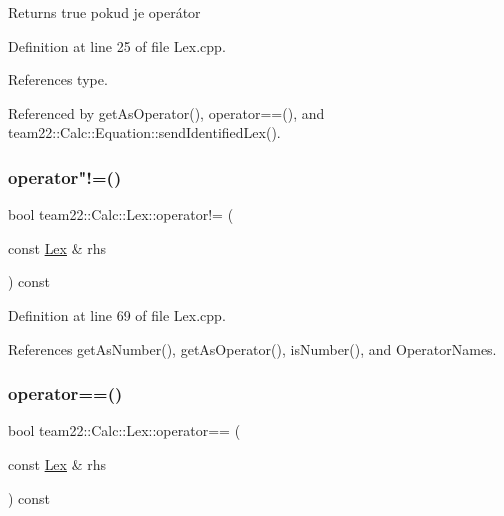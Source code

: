 \begin{DoxyReturn}{Returns}
true pokud je operátor 
\end{DoxyReturn}


Definition at line 25 of file Lex.\+cpp.



References type.



Referenced by get\+As\+Operator(), operator==(), and team22\+::\+Calc\+::\+Equation\+::send\+Identified\+Lex().

\mbox{\label{classteam22_1_1_calc_1_1_lex_a25b4f3b98b68c4d967eb3695efc78667}} 
\subsubsection{\texorpdfstring{operator"!=()}{operator!=()}}
{\footnotesize\ttfamily bool team22\+::\+Calc\+::\+Lex\+::operator!= (\begin{DoxyParamCaption}\item[{const \hyperlink{classteam22_1_1_calc_1_1_lex}{Lex} \&}]{rhs }\end{DoxyParamCaption}) const}



Definition at line 69 of file Lex.\+cpp.



References get\+As\+Number(), get\+As\+Operator(), is\+Number(), and Operator\+Names.

\mbox{\label{classteam22_1_1_calc_1_1_lex_a55858e2719cb121fccff59eed42dd692}} 
\subsubsection{\texorpdfstring{operator==()}{operator==()}}
{\footnotesize\ttfamily bool team22\+::\+Calc\+::\+Lex\+::operator== (\begin{DoxyParamCaption}\item[{const \hyperlink{classteam22_1_1_calc_1_1_lex}{Lex} \&}]{rhs }\end{DoxyParamCaption}) const}



